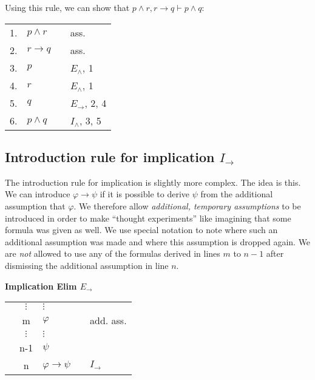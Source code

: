 \documentclass[nobib,nofonts]{tufte-handout}
\begin{document}
Using this rule, we can show that $p \wedge r, r \rightarrow q \vdash p \wedge q$:

\begin{tabular}{clcl}
  1. & $p \wedge r$      & & ass. \\
  2. & $r \rightarrow q$ & & ass.  \\
  3. & $p$               & & $E_{\wedge}$, 1  \\
  4. & $r$               & & $E_{\wedge}$, 1  \\
  5. & $q$               & & $E_{\rightarrow}$, 2, 4 \\
  6. & $p \wedge q$      & & $I_{\wedge}$, 3, 5
\end{tabular}

\subsection{Introduction rule for implication $I_{\rightarrow}$}

The introduction rule for implication is slightly more complex.
The idea is this.
We can introduce $\varphi \rightarrow \psi$ if it is possible to derive $\psi$ from the additional assumption that $\varphi$.
We therefore allow \emph{additional, temporary assumptions} to be introduced in order to make ``thought experiments'' like imagining that some formula was given as well.
We use special notation to note where such an additional assumption was made and where this assumption is dropped again.
We are \emph{not} allowed to use any of the formulas derived in lines $m$ to $n-1$ after dismissing the additional assumption in line $n$.

\bigskip
\noindent \colorbox{mygray!60}{\centering
  \begin{minipage}[t]{0.35\linewidth}
    \textbf{Implication Elim $E_{\rightarrow}$}
  \end{minipage}
  \begin{minipage}[t]{0.55\linewidth}
    \begin{tabular}{cclcl}
                         & $\vdots$  & $\vdots$                   & \\
      \cline{1-2} \vline & m         & $\varphi$                  & & add. ass.  \\
      \vline             & $ \vdots$ & $\vdots$                   & \\
      \vline             & n-1       & $\psi$                     & & \\ \hline
                         & n         & $\varphi \rightarrow \psi$ & & $I_{\rightarrow}$
    \end{tabular}
  \end{minipage}
}
\bigskip
\end{document}
